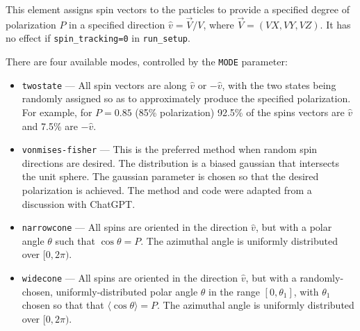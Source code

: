 This element assigns spin vectors to the particles to provide a specified degree of
polarization $P$ in a specified direction $\hat{v}=\vec{V}/V$, where
$\vec{V}=(VX,VY,VZ)$.
It has no effect if \verb|spin_tracking=0| in \verb|run_setup|.

There are four available modes, controlled by the \verb|MODE| parameter:
\begin{itemize}
\item \verb|twostate| --- All spin vectors are along $\hat{v}$ or $-\hat{v}$,
  with the two states being randomly assigned so as to approximately produce the specified polarization.
  For example, for $P=0.85$ (85\% polarization) 92.5\% of the spins vectors are $\hat{v}$ and
  7.5\% are $-\hat{v}$.
\item \verb|vonmises-fisher| --- This is the preferred method when random spin directions are desired. The distribution
  is a biased gaussian that intersects the unit sphere.  The gaussian parameter is chosen so that the desired polarization
  is achieved. The method and code were adapted from a discussion with ChatGPT.
\item \verb|narrowcone| --- All spins are oriented in the direction $\hat{v}$, but with a polar angle $\theta$ such
  that $\cos\theta=P$. The azimuthal angle is uniformly distributed over $[0, 2\pi)$. 
\item \verb|widecone| --- All spins are oriented in the direction $\hat{v}$, but with a randomly-chosen, uniformly-distributed polar angle
  $\theta$ in the range $[0,\theta_1]$, with $\theta_1$ chosen so that that $\langle \cos\theta\rangle=P$. The
  azimuthal angle is uniformly distributed over $[0, 2\pi)$.
\end{itemize}
